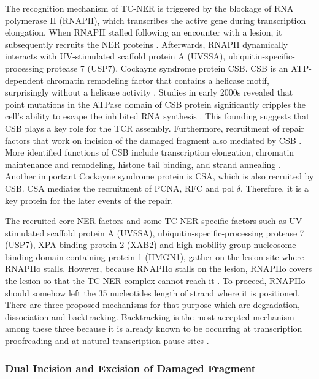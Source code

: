 The recognition mechanism of TC-NER is triggered by the blockage of RNA polymerase II (RNAPII), which transcribes the active gene during transcription elongation. When RNAPII stalled following an encounter with a lesion, it subsequently recruits the NER proteins \citep{svejstrup2002mechanisms}. Afterwards, RNAPII dynamically interacts with UV-stimulated scaffold protein A (UVSSA), ubiquitin-specific-processing protease 7 (USP7), Cockayne syndrome protein CSB. CSB is an ATP-dependent chromatin remodeling factor that contains a helicase motif, surprisingly without a helicase activity \citep{selby1997human}. Studies in early 2000s revealed that point mutations in the ATPase domain of CSB protein significantly cripples the cell’s ability to escape the inhibited RNA synthesis \citep{citterio1998biochemical,muftuoglu2002phenotypic}. This founding suggests that CSB plays a key role for the TCR assembly. Furthermore, recruitment of repair factors that work on incision of the damaged fragment also mediated by CSB \citep{fousteri2006cockayne}. More identified functions of CSB include transcription elongation, chromatin maintenance and remodeling, histone tail binding, and strand annealing \citep{selby1997cockayne}. Another important Cockayne syndrome protein is CSA, which is also recruited by CSB. CSA mediates the recruitment of PCNA, RFC and pol $\delta$. Therefore, it is a key protein for the later events of the repair.

The recruited core NER factors and some TC-NER specific factors such as UV-stimulated scaffold protein A (UVSSA), ubiquitin-specific-processing protease 7 (USP7), XPA-binding protein 2 (XAB2) and high mobility group nucleosome-binding domain-containing protein 1 (HMGN1), gather on the lesion site where RNAPIIo stalls. However, because RNAPIIo stalls on the lesion, RNAPIIo covers the lesion so that the TC-NER complex cannot reach it \citep{tornaletti1999structural}. To proceed, RNAPIIo should somehow left the 35 nucleotides length of strand where it is positioned. There are three proposed mechanisms for that purpose which are degradation, dissociation and backtracking. Backtracking is the most accepted mechanism among these three because it is already known to be occurring at transcription proofreading and at natural transcription pause sites \citep{marteijn2014understanding}. 

\subsubsection{Dual Incision and Excision of Damaged Fragment}

